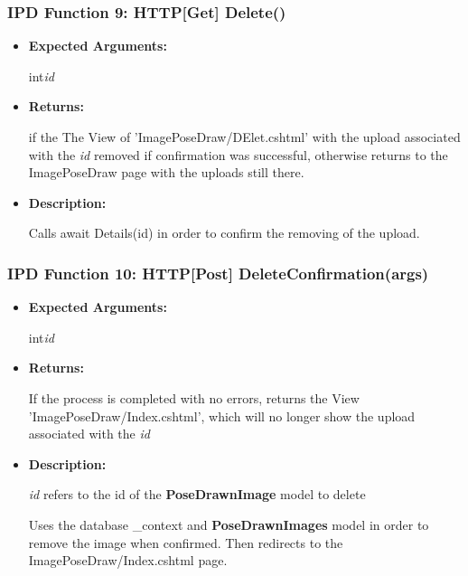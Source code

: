 \documentclass{scrreprt}
\begin{document}
\subsubsection{IPD Function 9: HTTP[Get] Delete()}

\begin{itemize}
        \item \textbf{Expected Arguments:}

                int\quad\textit{id}

        \item \textbf{Returns:}

                if the The View of 'ImagePoseDraw/DElet.cshtml' with the upload
                associated with the \textit{id} removed if confirmation was
                successful, otherwise returns to the ImagePoseDraw page with
                the uploads still there.

        \item \textbf{Description:}

                Calls await Details(id) in order to confirm the removing of the
                upload.
\end{itemize}



\subsubsection{IPD Function 10: HTTP[Post] DeleteConfirmation(args)}

\begin{itemize}
        \item \textbf{Expected Arguments:}

                int\quad\textit{id}

        \item \textbf{Returns:}

                If the process is completed with no errors, returns the View
                'ImagePoseDraw/Index.cshtml', which will no longer show the
                upload associated with the \textit{id}

        \item \textbf{Description:}

                \textit{id} refers to the id of the \textbf{PoseDrawnImage} model to delete

                Uses the database \_context and \textbf{PoseDrawnImages} model
                in order to remove the image when confirmed. Then redirects to
                the ImagePoseDraw/Index.cshtml page.

\end{itemize}
\end{document}

